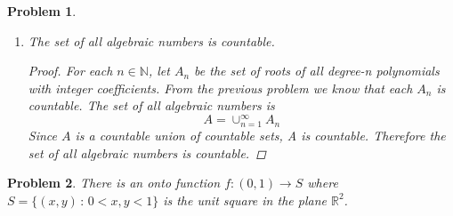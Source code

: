 \documentclass[12pt]{article}
\newtheorem{problem}{Problem}
\newcommand{\NN}{\ensuremath{\mathbb N}}
\newcommand{\RR}{\ensuremath{\mathbb R}}
\newcommand{\ZZ}{\ensuremath{\mathbb Z}}
\begin{document}
\begin{problem}
\begin{enumerate}
\begin{proof}
A polynomial $P \in P_n$ of degree $n$ with integer coefficients is defined as 
	$$P(x) = a_n x^n + a_{n-1} x^{n-1} + \dots + a_1 x + a_0 = 0$$ 
	where $a_i \in \ZZ$ and $a_n \neq 0$. Let $P_n$ denote the set of all such degree-n polynomials. Each polynomial is uniquely determined by the $(n+1)$-tuple $(a_n, a_{n-1}, \dots, a_1, a_0)$ where $a_n \neq 0$. This is a bijection between $P_n$ and a subset of $Z^{n+1}$. Since $Z^{n+1}$ is countable, any subset of $Z^{n+1}$ is at most countable. Therefore $P_n$ is countable. We can thus enumerate $P_n = \{P_1, P_2, P_3, \dots\}$. \newline \newline
	By the Fundamental Theorem of Algebra, each polynomial of degree $n$ has at most $n$ roots. For each $i \in \NN$, let $R_i$ denote the set of all roots of $P_i$. Then $|R_i| \leq n < \infty$. \newline \newline
	Every algebraic number in $A_n$ is, by definition a root of some polynomial in $P_n$. Therefore $A_n = \cup_{i=1}^{\infty} R_i$.
	Since $A_n$ is a countable union of finite sets, $A_n$ is countable.
\end{proof}

\item The set of all algebraic numbers is countable.

\begin{proof}
For each $n \in \NN$, let $A_n$ be the set of roots of all degree-n polynomials with integer coefficients. From the previous problem we know that each $A_n$ is countable. The set of all algebraic numbers is 
$$A = \cup_{n=1}^\infty A_n$$
Since $A$ is a countable union of countable sets, A is countable. Therefore the set of all algebraic numbers is countable.
\end{proof}
\end{enumerate}
\end{problem}


\begin{problem} %
There is an onto function $f:(0,1) \to S$ where $S=\{(x,y)\,:\,0<x,y<1\}$ is the unit square in the plane $\RR^2$.
\end{problem}

\end{document}

